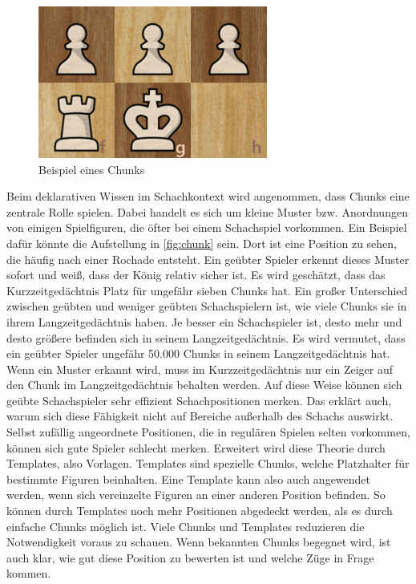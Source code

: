 \begin{figure}[b]
    \centering
    \includegraphics[height=5cm]{images/Chunk.png}
    \caption{Beispiel eines Chunks}
    \label{fig:chunk}
\end{figure}

Beim deklarativen Wissen im Schachkontext wird angenommen, dass Chunks eine zentrale Rolle spielen. Dabei handelt es sich um kleine Muster bzw. Anordnungen von einigen Spielfiguren, die öfter bei einem Schachspiel vorkommen. Ein Beispiel dafür könnte die Aufstellung in \autoref{fig:chunk} sein. Dort ist eine Position zu sehen, die häufig nach einer Rochade entsteht. Ein geübter Spieler erkennt dieses Muster sofort und weiß, dass der König relativ sicher ist. Es wird geschätzt, dass das Kurzzeitgedächtnis Platz für ungefähr sieben Chunks hat. Ein großer Unterschied zwischen geübten und weniger geübten Schachspielern ist, wie viele Chunks sie in ihrem Langzeitgedächtnis haben. Je besser ein Schachspieler ist, desto mehr und desto größere befinden sich in seinem Langzeitgedächtnis. Es wird vermutet, dass ein geübter Spieler ungefähr 50.000 Chunks in seinem Langzeitgedächtnis hat. Wenn ein Muster erkannt wird, muss im Kurzzeitgedächtnis nur ein Zeiger auf den Chunk im Langzeitgedächtnis behalten werden. Auf diese Weise können sich geübte Schachspieler sehr effizient Schachpositionen merken. Das erklärt auch, warum sich diese Fähigkeit nicht auf Bereiche außerhalb des Schachs auswirkt. Selbst zufällig angeordnete Positionen, die in regulären Spielen selten vorkommen, können sich gute Spieler schlecht merken. Erweitert wird diese Theorie durch Templates, also Vorlagen. Templates sind spezielle Chunks, welche Platzhalter für bestimmte Figuren beinhalten. Eine Template kann also auch angewendet werden, wenn sich vereinzelte Figuren an einer anderen Position befinden. So können durch Templates noch mehr Positionen abgedeckt werden, als es durch einfache Chunks möglich ist. Viele Chunks und Templates reduzieren die Notwendigkeit voraus zu schauen. Wenn bekannten Chunks begegnet wird, ist auch klar, wie gut diese Position zu bewerten ist und welche Züge in Frage kommen.
\cite{gobet_templates_1996}


